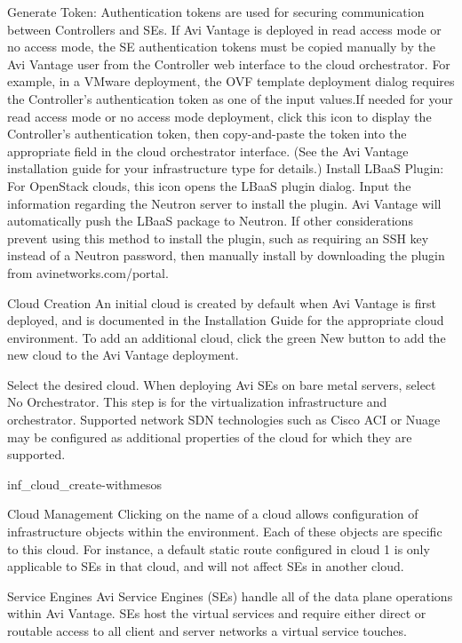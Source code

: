 \documentclass[letterpaper,10pt,english]{sphinxmanual}
\begin{document}
Generate Token: Authentication tokens are used for securing communication between Controllers and SEs. If Avi Vantage is deployed in read access mode or no access mode, the SE authentication tokens must be copied manually by the Avi Vantage user from the Controller web interface to the cloud orchestrator. For example, in a VMware deployment, the OVF template deployment dialog requires the Controller's authentication token as one of the input values.If needed for your read access mode or no access mode deployment, click this icon to display the Controller's authentication token, then copy-and-paste the token into the appropriate field in the cloud orchestrator interface. (See the Avi Vantage installation guide for your infrastructure type for details.)
Install LBaaS Plugin: For OpenStack clouds, this icon opens the LBaaS plugin dialog. Input the information regarding the Neutron server to install the plugin. Avi Vantage will automatically push the LBaaS package to Neutron. If other considerations prevent using this method to install the plugin, such as requiring an SSH key instead of a Neutron password, then manually install by downloading the plugin from avinetworks.com/portal.

Cloud Creation
An initial cloud is created by default when Avi Vantage is first deployed, and is documented in the Installation Guide for the appropriate cloud environment. To add an additional cloud, click the green New button to add the new cloud to the Avi Vantage deployment.

Select the desired cloud. When deploying Avi SEs on bare metal servers, select No Orchestrator. This step is for the virtualization infrastructure and orchestrator. Supported network SDN technologies such as Cisco ACI or Nuage may be configured as additional properties of the cloud for which they are supported.

inf\_cloud\_create-withmesos

Cloud Management
Clicking on the name of a cloud allows configuration of infrastructure objects within the environment. Each of these objects are specific to this cloud. For instance, a default static route configured in cloud 1 is only applicable to SEs in that cloud, and will not affect SEs in another cloud.

Service Engines
Avi Service Engines (SEs) handle all of the data plane operations within Avi Vantage. SEs host the virtual services and require either direct or routable access to all client and server networks a virtual service touches.
\end{document}
